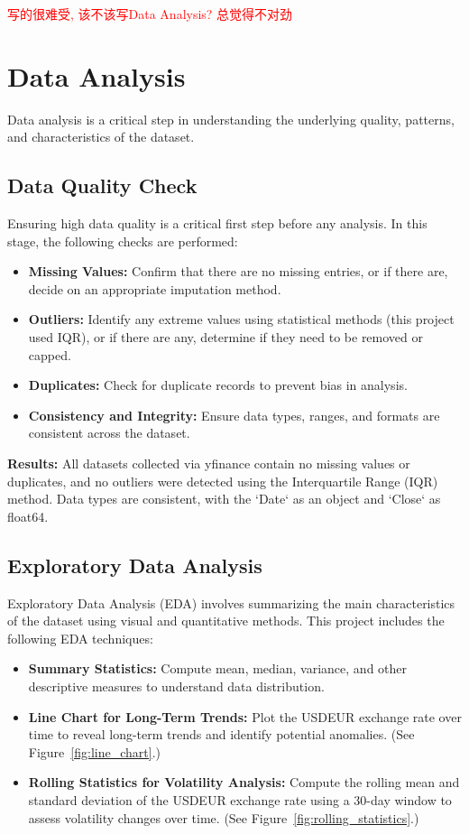 \textcolor{red}{写的很难受, 该不该写Data Analysis? 总觉得不对劲}

\section{Data Analysis}
Data analysis is a critical step in understanding the underlying quality, patterns, and characteristics of the dataset.

\subsection{Data Quality Check}
Ensuring high data quality is a critical first step before any analysis. In this stage, the following checks are performed:
\begin{itemize}
    \item \textbf{Missing Values:} Confirm that there are no missing entries, or if there are, decide on an appropriate imputation method.
    \item \textbf{Outliers:} Identify any extreme values using statistical methods (this project used IQR), or if there are any, determine if they need to be removed or capped.
    \item \textbf{Duplicates:} Check for duplicate records to prevent bias in analysis.
    \item \textbf{Consistency and Integrity:} Ensure data types, ranges, and formats are consistent across the dataset.
\end{itemize}

\textbf{Results:} All datasets collected via yfinance contain no missing values or duplicates, and no outliers were detected using the Interquartile Range (IQR) method. Data types are consistent, with the `Date` as an object and `Close` as float64.

\subsection{Exploratory Data Analysis}
Exploratory Data Analysis (EDA) involves summarizing the main characteristics of the dataset using visual and quantitative methods. This project includes the following EDA techniques:
\begin{itemize}
    \item \textbf{Summary Statistics:} Compute mean, median, variance, and other descriptive measures to understand data distribution.
    \item \textbf{Line Chart for Long-Term Trends:} Plot the USDEUR exchange rate over time to reveal long-term trends and identify potential anomalies. (See Figure~\ref{fig:line_chart}.)
    \item \textbf{Rolling Statistics for Volatility Analysis:} Compute the rolling mean and standard deviation of the USDEUR exchange rate using a 30-day window to assess volatility changes over time. (See Figure~\ref{fig:rolling_statistics}.)
\end{itemize}

